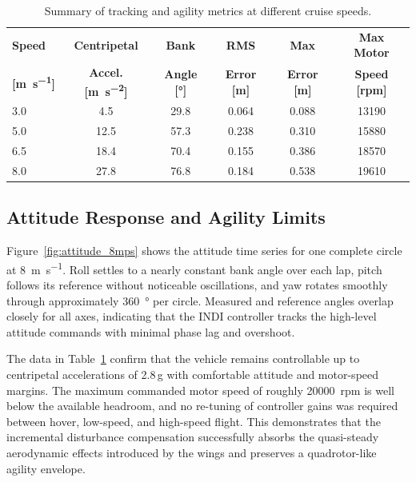 \begin{table}[htbp]
\centering
\caption{Summary of tracking and agility metrics at different cruise speeds.}
\label{tab:variable_speed_metrics}
\begin{tabular}{lccccc}
\hline
\textbf{Speed} & \textbf{Centripetal} & \textbf{Bank} & \textbf{RMS} & \textbf{Max} & \textbf{Max Motor} \\
\textbf{[\si{\meter\per\second}]} & \textbf{Accel. [\si{\meter\per\second\squared}]} & \textbf{Angle [\si{\degree}]} & \textbf{Error [\si{\meter}]} & \textbf{Error [\si{\meter}]} & \textbf{Speed [\si{rpm}]} \\
\hline
3.0 & 4.5 & 29.8 & 0.064 & 0.088 & 13190 \\
5.0 & 12.5 & 57.3 & 0.238 & 0.310 & 15880 \\
6.5 & 18.4 & 70.4 & 0.155 & 0.386 & 18570 \\
8.0 & 27.8 & 76.8 & 0.184 & 0.538 & 19610 \\
\hline
\end{tabular}
\end{table}

\subsection{Attitude Response and Agility Limits}\label{sec:agility}

Figure~\ref{fig:attitude_8mps} shows the attitude time series for one complete circle at \SI{8}{\meter\per\second}.
Roll settles to a nearly constant bank angle over each lap, pitch follows its reference without noticeable oscillations, and yaw rotates smoothly through approximately \SI{360}{\degree} per circle.
Measured and reference angles overlap closely for all axes, indicating that the INDI controller tracks the high-level attitude commands with minimal phase lag and overshoot.

The data in Table~\ref{tab:variable_speed_metrics} confirm that the vehicle remains controllable up to centripetal accelerations of 2.8\,g with comfortable attitude and motor-speed margins.
The maximum commanded motor speed of roughly \SI{20000}{rpm} is well below the available headroom, and no re-tuning of controller gains was required between hover, low-speed, and high-speed flight.
This demonstrates that the incremental disturbance compensation successfully absorbs the quasi-steady aerodynamic effects introduced by the wings and preserves a quadrotor-like agility envelope.

